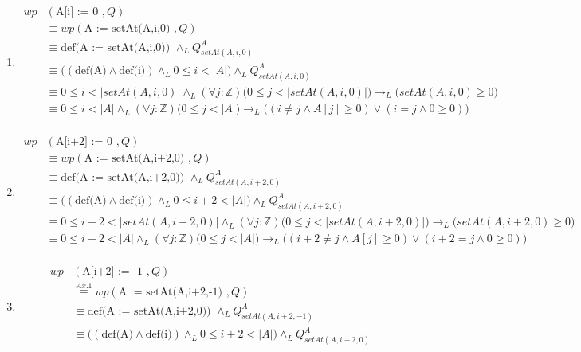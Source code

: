 \documentclass{article}
\begin{document}
\begin{enumerate}[label=\alph*)]
	\item
		\begin{align*}
		wp&(\textrm{A[i] := 0 },Q) \\
			&\equiv wp(\textrm{A := setAt(A,i,0) },Q) \\
			&\equiv \textrm{def(A := setAt(A,i,0)) }\wedge_L Q_{setAt(A,i,0)}^{A} \\
			&\equiv \Big((\textrm{def(A)}\wedge \textrm{def(i)})\wedge_L 0\leq i<|A|\Big) 
				\wedge_LQ_{setAt(A,i,0)}^{A} \\
			&\equiv 0\leq i<|setAt(A,i,0)| \wedge_L (\forall j :\mathbb{Z})
				\Big(0 \leq j < |setAt(A,i,0)|\Big) \rightarrow_L  
				\Big(setAt(A,i,0) \geq 0\Big)\\
			&\equiv 0\leq i<|A| \wedge_L (\forall j :\mathbb{Z})
				\Big(0 \leq j < |A|\Big) \rightarrow_L  
				\Big((i\neq j \wedge A[j] \geq 0)\vee(i=j\wedge 0\geq 0)\Big)\\
		\end{align*}
	\item
		\begin{align*}
		wp&(\textrm{A[i+2] := 0 },Q) \\
			&\equiv wp(\textrm{A := setAt(A,i+2,0) },Q) \\
			&\equiv \textrm{def(A := setAt(A,i+2,0)) }\wedge_L Q_{setAt(A,i+2,0)}^{A} \\
			&\equiv \Big((\textrm{def(A)}\wedge \textrm{def(i)})\wedge_L 0\leq i+2<|A|\Big) 
				\wedge_LQ_{setAt(A,i+2,0)}^{A} \\
			&\equiv 0\leq i+2<|setAt(A,i+2,0)| \wedge_L (\forall j :\mathbb{Z})
				\Big(0 \leq j < |setAt(A,i+2,0)|\Big) \rightarrow_L  
				\Big(setAt(A,i+2,0) \geq 0\Big)\\
			&\equiv 0\leq i+2<|A| \wedge_L (\forall j :\mathbb{Z})
				\Big(0 \leq j < |A|\Big) \rightarrow_L  
				\Big((i+2\neq j \wedge A[j] \geq 0)\vee(i+2=j\wedge 0\geq 0)\Big)\\
		\end{align*}
	\item
		\begin{align*}
		wp&(\textrm{A[i+2] := -1 },Q) \\
			&\stackrel{Ax.1}{\equiv} wp(\textrm{A := setAt(A,i+2,-1) },Q) \\
			&\equiv \textrm{def(A := setAt(A,i+2,0)) }\wedge_L Q_{setAt(A,i+2,-1)}^{A} \\
			&\equiv \Big((\textrm{def(A)}\wedge \textrm{def(i)})\wedge_L 0\leq i+2<|A|\Big) 
				\wedge_LQ_{setAt(A,i+2,0)}^{A} \\

\end{align*}
\end{enumerate}
\end{document}
